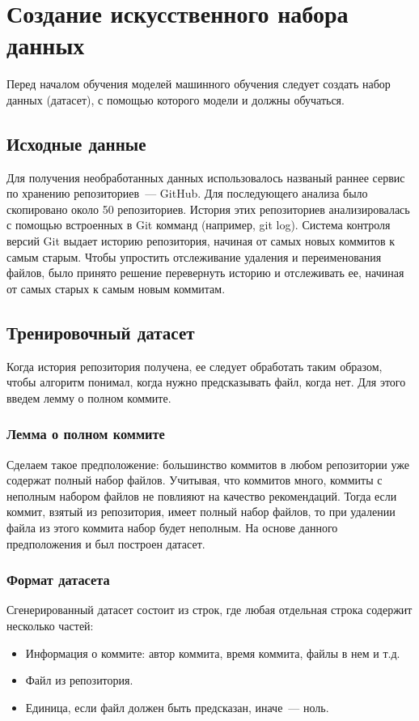 \section{Создание искусственного набора данных}
Перед началом обучения моделей машинного обучения следует создать набор данных (датасет), с помощью которого модели и должны обучаться.
    \subsection{Исходные данные}
Для получения необработанных данных использовалось названый раннее сервис по хранению репозиториев~--- GitHub. Для последующего анализа было скопировано около 50 репозиториев. История этих репозиториев анализировалась с помощью встроенных в Git комманд (например, git log). Система контроля версий Git выдает историю репозитория, начиная от самых новых коммитов к самым старым. Чтобы упростить отслеживание удаления и переименования файлов, было принято решение перевернуть историю и отслеживать ее, начиная от самых старых к самым новым коммитам.
    \subsection{Тренировочный датасет}
Когда история репозитория получена, ее следует обработать таким образом, чтобы алгоритм понимал, когда нужно предсказывать файл, когда нет. Для этого введем лемму о полном коммите.
    \subsubsection{Лемма о полном коммите}
Сделаем такое предположение: большинство коммитов в любом репозитории уже содержат полный набор файлов. Учитывая, что коммитов много, коммиты с неполным набором файлов не повлияют на качество рекомендаций. Тогда если коммит, взятый из репозитория, имеет полный набор файлов, то при удалении файла из этого коммита набор будет неполным. На основе данного предположения и был построен датасет.
    \subsubsection{Формат датасета}
Сгенерированный датасет состоит из строк, где любая отдельная строка содержит несколько частей:
    \begin{itemize}
		\item Информация о коммите: автор коммита, время коммита, файлы в нем и т.д.
		\item Файл из репозитория.
		\item Единица, если файл должен быть предсказан, иначе~--- ноль.
	\end{itemize}

